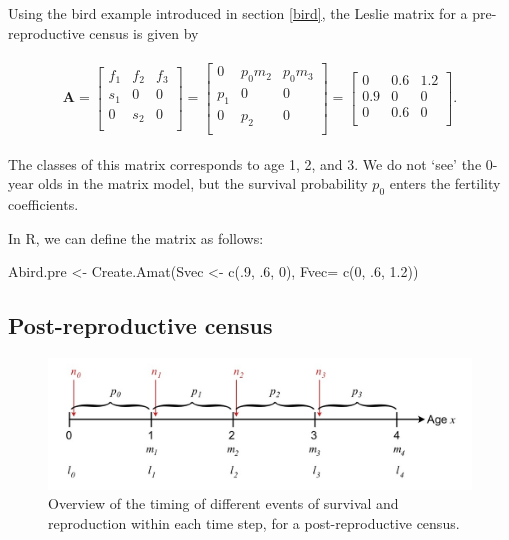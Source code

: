 \documentclass[
]{book}
\newenvironment{Shaded}{\begin{snugshade}}{\end{snugshade}}
\newcommand{\AttributeTok}[1]{\textcolor[rgb]{0.77,0.63,0.00}{#1}}
\newcommand{\DecValTok}[1]{\textcolor[rgb]{0.00,0.00,0.81}{#1}}
\newcommand{\FloatTok}[1]{\textcolor[rgb]{0.00,0.00,0.81}{#1}}
\newcommand{\FunctionTok}[1]{\textcolor[rgb]{0.00,0.00,0.00}{#1}}
\newcommand{\NormalTok}[1]{#1}
\newcommand{\OtherTok}[1]{\textcolor[rgb]{0.56,0.35,0.01}{#1}}
\begin{document}
Using the bird example introduced in section \ref{bird}, the Leslie matrix for a pre-reproductive census is given by

\begin{align}
\begin{split}
\mathbf{A}=\left[\begin{matrix} f_1 & f_2 &f_3  \\ s_1 &0&0\\ 0 & s_2 &0  \\  \end{matrix}\right]=\left[\begin{matrix} 0 & p_0m_2 &p_0m_3  \\ p_1 &0&0\\ 0 & p_2 &0  \\  \end{matrix}\right]=\left[\begin{matrix} 0 &0.6 &1.2  \\ 0.9 &0&0\\ 0 & 0.6 &0  \\  \end{matrix}\right].
\end{split}
\label{eq:Prerep}
\end{align}

The classes of this matrix corresponds to age 1, 2, and 3. We do not `see' the 0-year olds in the matrix model, but the survival probability \(p_0\) enters the fertility coefficients.

In R, we can define the matrix as follows:

\begin{Shaded}
\begin{Highlighting}[]
\NormalTok{Abird.pre }\OtherTok{\textless{}{-}} \FunctionTok{Create.Amat}\NormalTok{(Svec }\OtherTok{\textless{}{-}} \FunctionTok{c}\NormalTok{(.}\DecValTok{9}\NormalTok{, .}\DecValTok{6}\NormalTok{, }\DecValTok{0}\NormalTok{), }\AttributeTok{Fvec=} \FunctionTok{c}\NormalTok{(}\DecValTok{0}\NormalTok{, .}\DecValTok{6}\NormalTok{, }\FloatTok{1.2}\NormalTok{))  }
\end{Highlighting}
\end{Shaded}

\hypertarget{post-reproductive-census}{%
\subsection{Post-reproductive census}\label{post-reproductive-census}}

\begin{figure}
\includegraphics[width=1\linewidth]{SurvFecPostRep2} \caption{Overview of the timing of different events of survival and reproduction within each time step, for a post-reproductive census.}\label{fig:fig4}
\end{figure}
\end{document}
